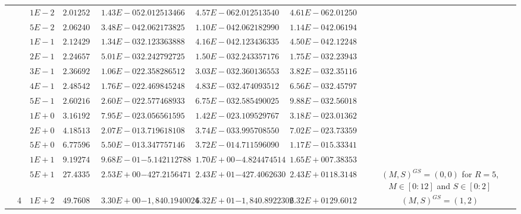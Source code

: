\begin{landscape}
\begin{table}[ht]
{\begin{tabular}[c]{c|c|c|c|c|c|c|c|c|c|c}
& &$1E-2$ & $2.012522647963$ & $1.43E-05$ & $2.012513466119$ & $4.57E-06$ & $2.012513540105$ & $4.61E-06$ & $2.012504269056$ & \\
& &$5E-2$ & $2.062404808005$ & $3.48E-04$ & $2.062173825512$ & $1.10E-04$ & $2.062182990983$ & $1.14E-04$ & $2.061947942318$ & \\
& &$1E-1$ & $2.124295000418$ & $1.34E-03$ & $2.123363888315$ & $4.16E-04$ & $2.123436335481$ & $4.50E-04$ & $2.122481353547$ & \\
& &$2E-1$ & $2.246574506683$ & $5.01E-03$ & $2.242792725798$ & $1.50E-03$ & $2.243357176090$ & $1.75E-03$ & $2.239439975058$ & \\
& &$3E-1$ & $2.366923700288$ & $1.06E-02$ & $2.358286512449$ & $3.03E-03$ & $2.360136553189$ & $3.82E-03$ & $2.351166061395$ & \\
& &$4E-1$ & $2.485425861700$ & $1.76E-02$ & $2.469845248267$ & $4.83E-03$ & $2.474093512102$ & $6.56E-03$ & $2.457973187497$ & \\
& &$5E-1$ & $2.602161579782$ & $2.60E-02$ & $2.577468933253$ & $6.75E-03$ & $2.585490025756$ & $9.88E-03$ & $2.560187735597$ & \\
& &$1E+0$ & $3.161921401726$ & $7.95E-02$ & $3.056561595695$ & $1.42E-02$ & $3.109529767677$ & $3.18E-02$ & $3.013626129397$ & \\
& &$2E+0$ & $4.185136950885$ & $2.07E-01$ & $3.719618108148$ & $3.74E-03$ & $3.995708550047$ & $7.02E-02$ & $3.733597603174$ & \\
& &$5E+0$ & $6.775965715485$ & $5.50E-01$ & $3.347757146059$ & $3.72E-01$ & $4.711596090878$ & $1.17E-01$ & $5.333416434792$ & \\
& &$1E+1$ & $9.192744506771$ & $9.68E-01$ & $-5.142112788917$ & $1.70E+00$ & $-4.824474514976$ & $1.65E+00$ & $7.383537264058$ & \\
& &$5E+1$ & $27.433561900391$ & $2.53E+00$ & $-427.215647186034$ & $2.43E+01$ & $-427.406263075788$ & $2.43E+01$ & $18.314898304163$ &  \multirow{-22}{3cm}{$(M,S)^{GS}=(0,0)$ for $R=5$, $M\in[0:12]$ and $S\in[0:2]$}  \\ \cline{10-11}
& \multirow{-23}{*}{4} &$1E+2$ & $49.760800203239$ & $3.30E+00$ & $-1,840.194002475680$ & $6.32E+01$ & $-1,840.892230228590$ & $6.32E+01$ & $29.601244919262$ & \multirow{-1}{3cm}{$(M,S)^{GS}=(1,2)$} \\ \cline{2-11}



\end{tabular}}
\end{table}
\end{landscape}
